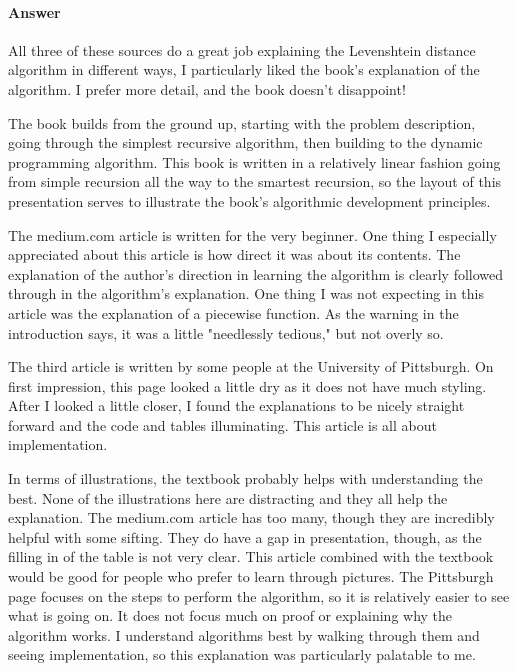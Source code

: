 \documentclass{article}
\begin{document}
\paragraph{Answer}

All three of these sources do a great job explaining the Levenshtein distance algorithm in different ways, I particularly liked the book's explanation of the algorithm. I prefer more detail, and the book doesn't disappoint!

The book builds from the ground up, starting with the problem description, going through the simplest recursive algorithm, then building to the dynamic programming algorithm. This book is written in a relatively linear fashion going from simple recursion all the way to the smartest recursion, so the layout of this presentation serves to illustrate the book's algorithmic development principles.

The medium.com article is written for the very beginner. One thing I especially appreciated about this article is how direct it was about its contents. The explanation of the author's direction in learning the algorithm is clearly followed through in the algorithm's explanation. One thing I was not expecting in this article was the explanation of a piecewise function. As the warning in the introduction says, it was a little "needlessly tedious," but not overly so.

The third article is written by some people at the University of Pittsburgh. On first impression, this page looked a little dry as it does not have much styling. After I looked a little closer, I found the explanations to be nicely straight forward and the code and tables illuminating. This article is all about implementation.

In terms of illustrations, the textbook probably helps with understanding the best. None of the illustrations here are distracting and they all help the explanation. The medium.com article has too many, though they are incredibly helpful with some sifting. They do have a gap in presentation, though, as the filling in of the table is not very clear. This article combined with the textbook would be good for people who prefer to learn through pictures. The Pittsburgh page focuses on the steps to perform the algorithm, so it is relatively easier to see what is going on. It does not focus much on proof or explaining why the algorithm works. I understand algorithms best by walking through them and seeing implementation, so this explanation was particularly palatable to me.
\end{document}
